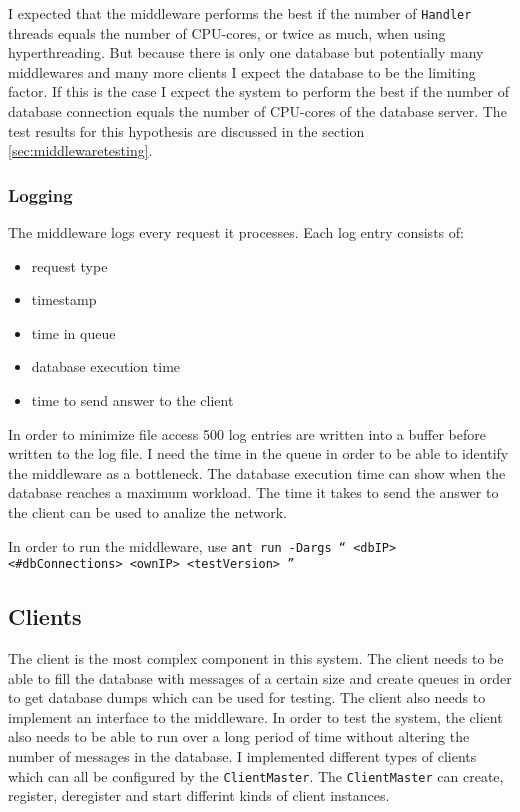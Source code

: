 \documentclass[
10pt, %
a4paper, %
oneside, %
headinclude,footinclude, %
BCOR5mm, %
]{scrartcl}
\begin{document}
I expected that the middleware performs the best if the number of \texttt{Handler} threads equals the number of CPU-cores, or twice as much, when using hyperthreading. But because there is only one database but potentially many middlewares and many more clients I expect the database to be the limiting factor. If this is the case I expect the system to perform the best if the number of database connection equals the number of CPU-cores of the database server. The test results for this hypothesis are discussed in the section \vref{sec:middlewaretesting}.


\subsubsection{Logging}
The middleware logs every request it processes. Each log entry consists of:
\begin{itemize}
\item request type
\item timestamp
\item time in queue
\item database execution time
\item time to send answer to the client
\end{itemize}

In order to minimize file access 500 log entries are written into a buffer before written to the log file. I need the time in the queue in order to be able to identify the middleware as a bottleneck. The database execution time can show when the database reaches a maximum workload. The time it takes to send the answer to the client can be used to analize the network.


In order to run the middleware, use \texttt{ant run -Dargs `` <dbIP> <\#dbConnections> <ownIP> <testVersion> ''}

\subsection{Clients}
The client is the most complex component in this system. The client needs to be able to fill the database with messages of a certain size and create queues in order to get database dumps which can be used for testing. The client also needs to implement an interface to the middleware. In order to test the system, the client also needs to be able to run over a long period of time without altering the number of messages in the database. I implemented different types of clients which can all be configured by the \texttt{ClientMaster}. The \texttt{ClientMaster} can create, register, deregister and start differint kinds of client instances.
\end{document}
